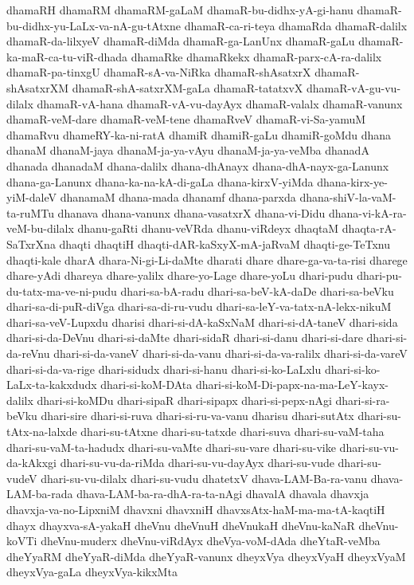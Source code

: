 {dhamaRH
dhamaRM
dhamaRM-gaLaM
dhamaR-bu-didhx-yA-gi-hanu
dhamaR-bu-didhx-yu-LaLx-va-nA-gu-tAtxne
dhamaR-ca-ri-teya
dhamaRda
dhamaR-dalilx
dhamaR-da-lilxyeV
dhamaR-diMda
dhamaR-ga-LanUnx
dhamaR-gaLu
dhamaR-ka-maR-ca-tu-viR-dhada
dhamaRke
dhamaRkekx
dhamaR-parx-cA-ra-dalilx
dhamaR-pa-tinxgU
dhamaR-sA-va-NiRka
dhamaR-shAsatxrX
dhamaR-shAsatxrXM
dhamaR-shA-satxrXM-gaLa
dhamaR-tatatxvX
dhamaR-vA-gu-vu-dilalx
dhamaR-vA-hana
dhamaR-vA-vu-dayAyx
dhamaR-valalx
dhamaR-vanunx
dhamaR-veM-dare
dhamaR-veM-tene
dhamaRveV
dhamaR-vi-Sa-yamuM
dhamaRvu
dhameRY-ka-ni-ratA
dhamiR
dhamiR-gaLu
dhamiR-goMdu
dhana
dhanaM
dhanaM-jaya
dhanaM-ja-ya-vAyu
dhanaM-ja-ya-veMba
dhanadA
dhanada
dhanadaM
dhana-dalilx
dhana-dhAnayx
dhana-dhA-nayx-ga-Lanunx
dhana-ga-Lanunx
dhana-ka-na-kA-di-gaLa
dhana-kirxV-yiMda
dhana-kirx-ye-yiM-daleV
dhanamaM
dhana-mada
dhanamf
dhana-parxda
dhana-shiV-la-vaM-ta-ruMTu
dhanava
dhana-vanunx
dhana-vasatxrX
dhana-vi-Didu
dhana-vi-kA-ra-veM-bu-dilalx
dhanu-gaRti
dhanu-veVRda
dhanu-viRdeyx
dhaqtaM
dhaqta-rA-SaTxrXna
dhaqti
dhaqtiH
dhaqti-dAR-kaSxyX-mA-jaRvaM
dhaqti-ge-TeTxnu
dhaqti-kale
dharA
dhara-Ni-gi-Li-daMte
dharati
dhare
dhare-ga-va-ta-risi
dharege
dhare-yAdi
dhareya
dhare-yalilx
dhare-yo-Lage
dhare-yoLu
dhari-pudu
dhari-pu-du-tatx-ma-ve-ni-pudu
dhari-sa-bA-radu
dhari-sa-beV-kA-daDe
dhari-sa-beVku
dhari-sa-di-puR-diVga
dhari-sa-di-ru-vudu
dhari-sa-leY-va-tatx-nA-lekx-nikuM
dhari-sa-veV-Lupxdu
dharisi
dhari-si-dA-kaSxNaM
dhari-si-dA-taneV
dhari-sida
dhari-si-da-DeVnu
dhari-si-daMte
dhari-sidaR
dhari-si-danu
dhari-si-dare
dhari-si-da-reVnu
dhari-si-da-vaneV
dhari-si-da-vanu
dhari-si-da-va-ralilx
dhari-si-da-vareV
dhari-si-da-va-rige
dhari-sidudx
dhari-si-hanu
dhari-si-ko-LaLxlu
dhari-si-ko-LaLx-ta-kakxdudx
dhari-si-koM-DAta
dhari-si-koM-Di-papx-na-ma-LeY-kayx-dalilx
dhari-si-koMDu
dhari-sipaR
dhari-sipapx
dhari-si-pepx-nAgi
dhari-si-ra-beVku
dhari-sire
dhari-si-ruva
dhari-si-ru-va-vanu
dharisu
dhari-sutAtx
dhari-su-tAtx-na-lalxde
dhari-su-tAtxne
dhari-su-tatxde
dhari-suva
dhari-su-vaM-taha
dhari-su-vaM-ta-hadudx
dhari-su-vaMte
dhari-su-vare
dhari-su-vike
dhari-su-vu-da-kAkxgi
dhari-su-vu-da-riMda
dhari-su-vu-dayAyx
dhari-su-vude
dhari-su-vudeV
dhari-su-vu-dilalx
dhari-su-vudu
dhatetxV
dhava-LAM-Ba-ra-vanu
dhava-LAM-ba-rada
dhava-LAM-ba-ra-dhA-ra-ta-nAgi
dhavalA
dhavala
dhavxja
dhavxja-va-no-LipxniM
dhavxni
dhavxniH
dhavxsAtx-haM-ma-ma-tA-kaqtiH
dhayx
dhayxva-sA-yakaH
dheVnu
dheVnuH
dheVnukaH
dheVnu-kaNaR
dheVnu-koVTi
dheVnu-muderx
dheVnu-viRdAyx
dheVya-voM-dAda
dheYtaR-veMba
dheYyaRM
dheYyaR-diMda
dheYyaR-vanunx
dheyxVya
dheyxVyaH
dheyxVyaM
dheyxVya-gaLa
dheyxVya-kikxMta
}
